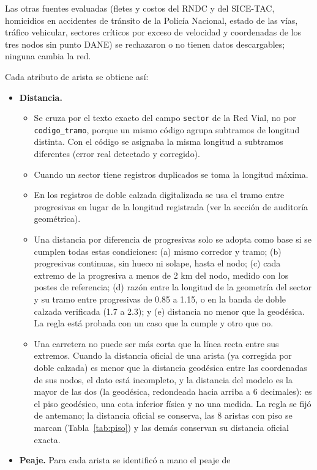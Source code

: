 \documentclass[12pt,a4paper]{article}
\begin{document}
Las otras fuentes evaluadas (fletes y costos del RNDC y del SICE-TAC,
homicidios en accidentes de tránsito de la Policía Nacional, estado de las
vías, tráfico vehicular, sectores críticos por exceso de velocidad y
coordenadas de los tres nodos sin punto DANE) se rechazaron o no tienen datos
descargables; ninguna cambia la red.

Cada atributo de arista se obtiene así:

\begin{itemize}
\item \textbf{Distancia.}
\begin{itemize}
\item Se cruza por el texto exacto del campo \texttt{sector} de la Red Vial, no
por \texttt{codigo\_tramo}, porque un mismo código agrupa subtramos de longitud
distinta. Con el código se asignaba la misma longitud a subtramos diferentes
(error real detectado y corregido).
\item Cuando un sector tiene registros duplicados se toma la longitud máxima.
\item En los registros de doble calzada digitalizada se usa el tramo entre
progresivas en lugar de la longitud registrada (ver la sección de auditoría
geométrica).
\item Una distancia por diferencia de progresivas solo se adopta como base si
se cumplen todas estas condiciones: (a) mismo corredor y tramo; (b)
progresivas continuas, sin hueco ni solape, hasta el nodo; (c) cada extremo de
la progresiva a menos de 2 km del nodo, medido con los postes de referencia;
(d) razón entre la longitud de la geometría del sector y su tramo entre
progresivas de 0.85 a 1.15, o en la banda de doble calzada verificada (1.7 a
2.3); y (e) distancia no menor que la geodésica. La regla está probada con un
caso que la cumple y otro que no.
\item Una carretera no puede ser más corta que la línea recta entre sus
extremos. Cuando la distancia oficial de una arista (ya corregida por doble
calzada) es menor que la distancia geodésica entre las coordenadas de sus
nodos, el dato está incompleto, y la distancia del modelo es la mayor de las
dos (la geodésica, redondeada hacia arriba a 6 decimales): es el piso
geodésico, una cota inferior física y no una medida. La regla se fijó de
antemano; la distancia oficial se conserva, las 8 aristas con piso se
marcan (Tabla~\ref{tab:piso}) y las demás conservan su distancia oficial
exacta.
\end{itemize}
\item \textbf{Peaje.} Para cada arista se identificó a mano el peaje de

\end{itemize}
\end{document}
